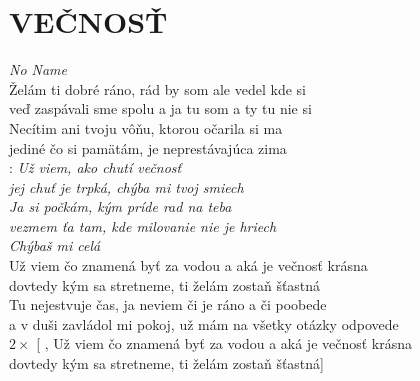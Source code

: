 \section*{\Huge VEČNOSŤ}
\emph{No Name}\\

Želám ti dobré ráno, rád by som ale vedel kde si\\
veď zaspávali sme spolu 
a ja tu som a ty tu nie si\\

Necítim ani tvoju vôňu, ktorou očarila si ma\\ 
jediné čo si pamätám, je neprestávajúca zima\\ 

\textregistered: \emph{Už viem, ako chutí večnosť\\
jej chuť je trpká, chýba mi tvoj smiech\\
Ja si počkám, kým príde rad na teba\\
vezmem ťa tam, kde milovanie nie je hriech\\
Chýbaš mi celá}\\

Už viem čo znamená byť za vodou a aká je večnosť krásna\\
dovtedy kým sa stretneme, ti želám zostaň šťastná\\

Tu nejestvuje čas, ja neviem či je ráno a či poobede \\
a v duši zavládol mi pokoj, už mám na všetky otázky odpovede\\

$2\times$ [ \textregistered, Už viem čo znamená byť za vodou a aká je večnosť krásna\\
dovtedy kým sa stretneme, ti želám zostaň šťastná]


\newpage
